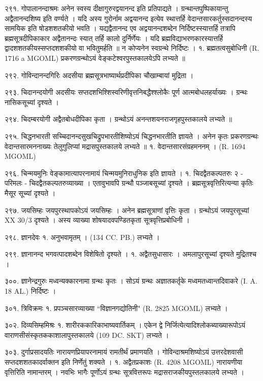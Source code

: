 २९१. गोपालानन्दाश्रमः
अनेन स्वस्य दीक्षागुरुरद्वयानन्द इति प्रतिपाद्यते । ग्रन्थान्तपुष्पिकायान्तु अद्वैतानन्दशिष्य इति वर्ण्यते । यदि अस्य गुरोर्नाम अद्वयानन्द इत्येव स्थात्तर्हि वेदान्तसारकर्तुस्सदानन्दस्य सामयिक इति षोडशशतकीयो भवति । यद्यद्वैतानन्द एव अद्वयानन्दशब्देन निर्दिष्टस्स्यात्तर्हि तत्रापि ब्रह्मसूत्रदीपिकाकार अद्वैतानन्दः स्यात् तर्हि कालो दुर्निर्णेयः । यदि ब्रह्मविद्याभरणकारस्यात्तर्हि द्वादशशतकीयस्सप्तदशशकीयो वा भवितुमर्हति ॥ न कोप्यनेन स्वग्रन्थे निर्दिष्टः ।
१. ब्रह्मतत्वसुबोधिनी (R. 1716 a MGOML) प्रकरणग्रन्थोऽयं वेङ्कटेश्वरपुस्तकालयेऽपि लभ्यते ॥

२९२. गोविन्दानन्दगिरिः
अदसीया ब्रह्मसूत्रभाष्यार्थप्रदीपिका चौखाम्बायां मुद्रिता ।

२९३. चिदानन्दयोगी
अदसीयः सप्तदशभिश्शिस्वरिणीवृत्तनिबद्धैश्श्लोकैः पूर्ण आत्मबोधलहर्याख्यः । ग्रन्थः नासिकसूच्यां दृश्यते ।

२९४. चिदम्बरयोगी
अद्वैतबोधदीपिका कृता । ग्रन्थोऽयं अनन्तशयनराजगृहपुस्तकालये लभ्यते ॥

२९५. चिद्धनभारती 
सच्चिदानन्दसुखचिद्रुपभारतीशिष्योऽयं चिद्धनभारतीति ज्ञायते । अनेन कृतः प्रकरणग्रन्थः वेदान्तसारमननाख्यः तेलुगुलिप्यां मद्रासपुस्तकालये लभ्यते ॥
१. वेदान्तसारसंग्रहमननम् । (R. 1694 MGOML)

२९६. चिन्मयमुनिः 
वेङ्कामात्यापरनामायं चिन्मयमुनिराधुनिक इति ज्ञायते ।
१. चिदद्वैतकल्पतरुः २ - परिमलः - चिदद्वैतकल्पतरुव्याख्या । एतावुभावपि ग्रन्थौ पञ्जाबसूच्यां दृश्यते । ब्रह्मसूत्रवृत्तिरित्यन्या कृतिः मैसूर सूच्यां दृश्यते ।

२९७. जयसिम्हः 
जयपुरस्थापकोऽयं जयसिम्हः । अनेन ब्रह्मसूत्राणां वृत्तिः कृता । ग्रन्थोऽयं जयपुरसूच्यां XX 30/3 दृश्यते । अस्य व्याख्या शोषयादवपण्डितकृता सूत्रवृत्तिप्रबोधिनी ।

२९८. ज्ञानदेवः
१. अनुभवामृतम् । (134 CC. PB.) लभ्यते ।

२९९. ज्ञानानन्द
भगवत्पादशब्देन विशेषितो दृश्यते ।
१. अद्वैतसुधासारः । अमलापुरसूच्यां दृश्यते मुद्रितश्च ।

३००. ज्ञानेन्द्रगुरुः
मध्वन्यक्कारनामा ग्रन्थः कृतः । सोऽयं ग्रन्थः अज्ञातकर्तृके मध्वमतध्वान्तदिवाकरे (I. A. 18 AL.) निर्दिष्टः ।

३०१. त्रिविक्रमः
१. प्रपञ्चसारव्याख्या ``विज्ञानगद्योतिनी" (R. 2825 MGOML) लभ्यते ।

३०२. दिव्यसिम्हमिश्रः
१. शारीरककारिकाभाष्यवार्तिकम् । एकेन द्वे निर्जित्येत्यादिश्लोकब्याख्यारूपोऽयं वाराणसीसंस्कृतककाशालापुस्तकालये (109 DC. SKT) लभ्यते ।

३०३. दुर्गाप्रसादयतिः
नारायणप्रियापरनामायं रामतीर्थं प्रमाणयति । गोविन्दाश्रमशिष्योऽयं उत्तरदेशवासी सप्तदशशतकादर्वाक्तन इति निर्णेतुं शक्यते ।
१. अद्वैतप्रकाशः (R. 4208 MGOML)
नारायणीया वृत्तिरिति नामान्तरम् । नवभिः भागैः पूर्णोऽयं ग्रन्थः सूत्रवित्तरूपः मद्रासराजकीयपुस्तलकालये लभ्यते ।

